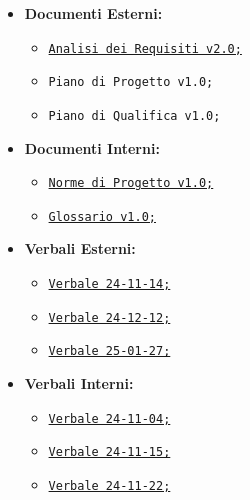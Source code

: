 \documentclass{article}
\begin{document}
\begin{itemize}
     \item \textbf{Documenti Esterni:}
        \begin{itemize}
            \item \href{https://code7crusaders.github.io/docs/RTB/documentazione_esterna/analisi_dei_requisiti/analisi_dei_requisiti.html}{\texttt{Analisi dei Requisiti v2.0;}}
            \item \texttt{Piano di Progetto v1.0;}
            \item \texttt{Piano di Qualifica v1.0;}
        \end{itemize}
        \item \textbf{Documenti Interni:}
        \begin{itemize}
            \item \href{https://code7crusaders.github.io/docs/RTB/documentazione_interna/norme_di_progetto.html}{\texttt{Norme di Progetto v1.0;}}
            \item \href{https://code7crusaders.github.io/docs/RTB/documentazione_interna/glossario.html}{\texttt{Glossario v1.0;}}
        \end{itemize}
        \item \textbf{Verbali Esterni:}
        \begin{itemize}
            \item \href{https://code7crusaders.github.io/docs/RTB/verbali_esterni/verbale_24-11-14_v1.0.html}{\texttt{Verbale 24-11-14;}}
            \item \href{https://code7crusaders.github.io/docs/RTB/verbali_esterni/verbale_24-12-12_v1.0.html}{\texttt{Verbale 24-12-12;}}
            \item \href{https://code7crusaders.github.io/docs/RTB/verbali_esterni/verbale_25-01-27_v1.0.html}{\texttt{Verbale 25-01-27;}}
        \end{itemize}
        \item \textbf{Verbali Interni:}
        \begin{itemize}
            \item \href{https://code7crusaders.github.io/docs/RTB/verbali_interni/verbale_24-11-04_v1.0.html}{\texttt{Verbale 24-11-04;}}
            \item \href{https://code7crusaders.github.io/docs/RTB/verbali_interni/verbale_24-11-15_v1.0.html}{\texttt{Verbale 24-11-15;}}
            \item \href{https://code7crusaders.github.io/docs/RTB/verbali_interni/verbale_24-11-22_v1.0.html}{\texttt{Verbale 24-11-22;}}

\end{itemize}
\end{itemize}
\end{document}
